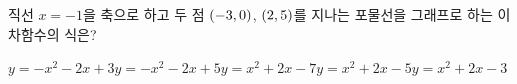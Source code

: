직선 $x=-1$을 축으로 하고 두 점 $(-3{,}\mkern3mu\mathopen{}0)$, $(2{,}\mkern3mu\mathopen{}5)$를 지나는 포물선을 그래프로 하는 이차함수의 식은?
\begin{choices32}{$y=-x^2-2x+3$}{$y=-x^2-2x+5$}{$y=x^2+2x-7$}{$y=x^2+2x-5$}{$y=x^2+2x-3$}\end{choices32}
